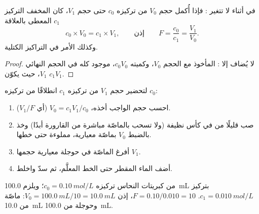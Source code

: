 \begin{proposition}\label{prop:g10:concentration-and-dilution:kept}
في أثناء  لا تتغير  : فإذا أُكمل حجم $V_0$ من 
تركيزه $c_0$ حتى حجم $V_1$، كان  المخفف التركيز $c_1$ المعطى
بالعلاقة
\[
  c_0 \times V_0 = c_1 \times V_1,
  \qquad\text{إذن}\qquad
  F = \frac{c_0}{c_1} = \frac{V_1}{V_0} .
\]
وكذلك الأمر في التراكيز الكتلية.
\end{proposition}

\begin{proof}
لا يُضاف إلا :  المأخوذ مع الحجم $V_0$، وكميته
$c_0 V_0$، موجود كله في الحجم النهائي $V_1$، حيث يكوّن  $c_1 V_1$.
\end{proof}


\begin{method}\label{met:g10:concentration-and-dilution:diluting}
لتحضير حجم $V_1$ من  تركيزه $c_1$ انطلاقًا من 
تركيزه $c_0$:
\begin{enumerate}
  \item احسب حجم  الواجب أخذه،
        $V_0 = c_1 V_1 / c_0$ (أي $V_1 / F$).
  \item صب قليلًا من  في كأس نظيفة (ولا تسحب بالماصّة مباشرة
        من القارورة أبدًا) وخذ بالضبط $V_0$ بماصّة
        معيارية، مملوءة حتى خطها.
  \item أفرغ الماصّة في حوجلة معيارية حجمها $V_1$.
  \item أضف الماء المقطر حتى الخط المعلَّم، ثم سدّ واخلط.
\end{enumerate}
\end{method}

\begin{example}\label{ex:g10:concentration-and-dilution:tenfold}
 من كبريتات النحاس تركيزه $c_0 = \qty{0.10}{mol/L}$؛ ويلزم
\qty{100.0}{mL} بتركيز $c_1 = \qty{0.010}{mol/L}$. 
$F = 0.10 / 0.010 = 10$، إذن $V_0 = \qty{100.0}{mL} / 10 =
\qty{10.0}{mL}$: ماصّة من \qty{10.0}{mL} وحوجلة من \qty{100.0}{mL}.
\end{example}


